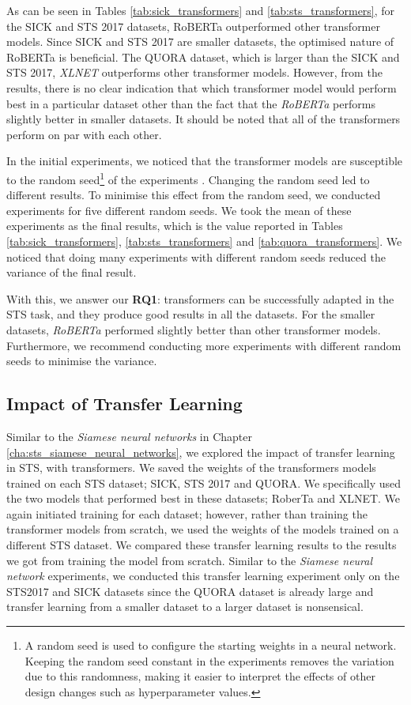 As can be seen in Tables \ref{tab:sick_transformers} and \ref{tab:sts_transformers}, for the SICK and STS 2017 datasets, RoBERTa outperformed other transformer models. Since SICK and STS 2017 are smaller datasets, the optimised nature of RoBERTa is beneficial. The QUORA dataset, which is larger than the SICK and STS 2017, \textit{XLNET}  outperforms other transformer models. However, from the results, there is no clear indication that which transformer model would perform best in a particular dataset other than the fact that the \textit{RoBERTa} performs slightly better in smaller datasets. It should be noted that all of the transformers perform on par with each other. 

In the initial experiments, we noticed that the transformer models are susceptible to the random seed\footnote{A random seed is used to configure the starting weights in a neural network. Keeping the random seed constant in the experiments removes the variation due to this randomness, making it easier to interpret the effects of other design changes such as hyperparameter values.} of the experiments \autocite{zhang2021revisiting}. Changing the random seed led to different results. To minimise this effect from the random seed, we conducted experiments for five different random seeds. We took the mean of these experiments as the final results, which is the value reported in Tables \ref{tab:sick_transformers}, \ref{tab:sts_transformers} and \ref{tab:quora_transformers}. We noticed that doing many experiments with different random seeds reduced the variance of the final result. 

With this, we answer our \textbf{RQ1}: transformers can be successfully adapted in the STS task, and they produce good results in all the datasets. For the smaller datasets, \textit{RoBERTa} performed slightly better than other transformer models. Furthermore, we recommend conducting more experiments with different random seeds to minimise the variance.


\subsection{Impact of Transfer Learning}
\label{sec:transformer_transfer}
Similar to the \textit{Siamese neural networks} in Chapter \ref{cha:sts_siamese_neural_networks}, we explored the impact of transfer learning  in STS, with transformers. We saved the weights of the transformers models trained on each STS dataset; SICK, STS 2017 and QUORA. We specifically used the two models that performed best in these datasets; RoberTa and XLNET. We again initiated training for each dataset; however, rather than training the transformer models from scratch, we used the weights of the models trained on a different STS dataset. We compared these transfer learning results to the results we got from training the model from scratch. Similar to the \textit{Siamese neural network} experiments, we conducted this transfer learning experiment only on the STS2017 and SICK datasets since the QUORA dataset is already large and transfer learning from a smaller dataset to a larger dataset is nonsensical.


